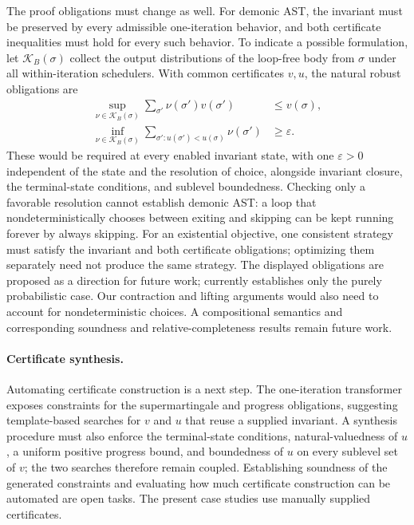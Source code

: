 The proof obligations must change as well. For demonic AST, the invariant must be preserved by every admissible one-iteration behavior, and both certificate inequalities must hold for every such behavior. To indicate a possible formulation, let $\mathcal{K}_B(\sigma)$ collect the output distributions of the loop-free body from $\sigma$ under all within-iteration schedulers. With common certificates $v,u$, the natural robust obligations are
\begin{align*}
 \sup_{\nu\in\mathcal{K}_B(\sigma)}
   \sum_{\sigma'}\nu(\sigma')v(\sigma')
   &\leq v(\sigma),\\
 \inf_{\nu\in\mathcal{K}_B(\sigma)}
   \sum_{\sigma':u(\sigma')<u(\sigma)}\nu(\sigma')
   &\geq\varepsilon.
\end{align*}
These would be required at every enabled invariant state, with one $\varepsilon>0$ independent of the state and the resolution of choice, alongside invariant closure, the terminal-state conditions, and sublevel boundedness. Checking only a favorable resolution cannot establish demonic AST: a loop that nondeterministically chooses between exiting and skipping can be kept running forever by always skipping. For an existential objective, one consistent strategy must satisfy the invariant and both certificate obligations; optimizing them separately need not produce the same strategy. The displayed obligations are proposed as a direction for future work;  currently establishes only the purely probabilistic case. Our contraction and lifting arguments would also need to account for nondeterministic choices. A compositional semantics and corresponding soundness and relative-completeness results remain future work.

\paragraph{Certificate synthesis.}
Automating certificate construction is a next step. The one-iteration transformer exposes constraints for the supermartingale and progress obligations, suggesting template-based searches for $v$ and $u$ that reuse a supplied invariant. A synthesis procedure must also enforce the terminal-state conditions, natural-valuedness of $u$, a uniform positive progress bound, and boundedness of $u$ on every sublevel set of $v$; the two searches therefore remain coupled. Establishing soundness of the generated constraints and evaluating how much certificate construction can be automated are open tasks. The present case studies use manually supplied certificates.

